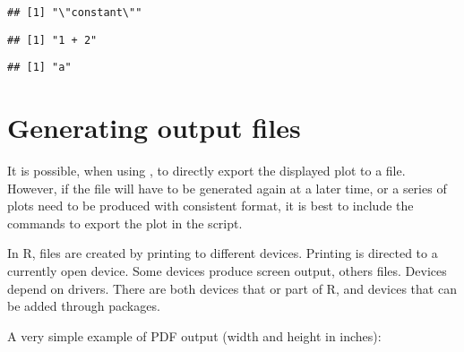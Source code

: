 \documentclass[krantz2]{krantz}\usepackage{knitr}%
\begin{document}
\begin{knitrout}\footnotesize
{}\color{fgcolor}\begin{kframe}
\begin{alltt}
 \hlkwb{<-} \hlstd{(}\hlstd{) \{}
  \hlstd{(}\hlstd{(}
\hlstd{\}}

 \hlkwb{<-} 

\hlstd{(}\hlstd{)}
\end{alltt}
\begin{verbatim}
## [1] "\"constant\""
\end{verbatim}
\begin{alltt}
\hlstd{(} \hlopt{+} \hlstd{)}
\end{alltt}
\begin{verbatim}
## [1] "1 + 2"
\end{verbatim}
\begin{alltt}
\end{alltt}
\begin{verbatim}
## [1] "a"
\end{verbatim}
\end{kframe}
\end{knitrout}


\section{Generating output files}
It is possible, when using \RStudio, to directly export the displayed plot to a file. However, if the file will have to be generated again at a later time, or a series of plots need to be produced with consistent format, it is best to include the commands to export the plot in the script.

In R, files are created by printing to different devices. Printing is directed to a currently open device. Some devices produce screen output, others files. Devices depend on drivers. There are both devices that or part of R, and devices that can be added through packages.

A very simple example of PDF output (width and height in inches):
\end{document}
